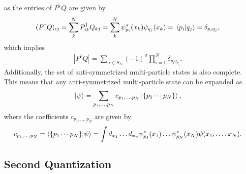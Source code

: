 \documentclass[10pt]{article}
\begin{document}
as the entries of $P^\dagger Q$ are given by
\begin{align}
(P^\dagger Q)_{ij}
=\sum_k^NP^\dagger_{ik}Q_{kj}
=\sum_k^N\psi^*_{p_i}(x_k)\psi_{q_j}(x_k)
=\bra*{p_i}\ket*{q_j}
=\delta_{p_iq_j},
\end{align}
which implies
\begin{align}
|P^\dagger Q|=\sum_{\sigma\in S_N}(-1)^\sigma\prod_{i=1}^N\delta_{p_iq_{\sigma_i}}.
\end{align}
Additionally, the set of anti-symmetrized multi-particle states is also complete. This means that any anti-symmetrized multi-particle state can be expanded as
\begin{align}
\ket{\psi}=\sum_{p_1,\ldots ,p_N}c_{p_1,\ldots ,p_N}\ket{\{p_1\cdots p_N\}},
\end{align}
where the coefficients $c_{p_1,\ldots ,p_N}$ are given by
\begin{align}
c_{p_1,\ldots ,p_N}=\bra{\{p_1\cdots p_N\}}\ket{\psi}=\int d_{x_1}\ldots d_{x_n}\psi^*_{p_1}(x_1)\ldots \psi^*_{p_N}(x_N)\psi(x_1,\ldots ,x_N).    
\end{align}

\subsection{Second Quantization}

\nocite{morten_second_quant}
\end{document}
